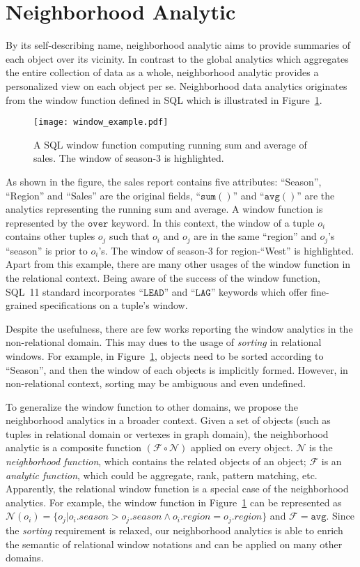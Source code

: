 \section{Neighborhood Analytic}
By its self-describing name, neighborhood analytic aims to provide
summaries of each object over its vicinity. In contrast to the global
analytics which aggregates the entire collection of data as a whole, neighborhood
analytic provides a personalized view on each object per se. Neighborhood
data analytics originates from the window function defined in  SQL which is
illustrated in Figure~\ref{fig:window}.

\begin{figure}[h]
\centering
\texttt{[image: window\_example.pdf]}
\caption{A SQL window function computing running sum and average of
sales. The window of season-3 is highlighted.} 
\label{fig:window}
\end{figure}

As shown in the figure, the sales report contains five attributes: 
``Season'', ``Region'' and ``Sales'' are the original fields, ``$\mathtt{sum()}$'' and ``$\mathtt{avg()}$''
are the analytics representing the running sum and average. A window function
is represented by the $\mathtt{over}$ keyword. In this context, the window of a tuple $o_i$
contains other tuples $o_j$ such that $o_i$ and $o_j$ are in the same ``region'' and $o_j$'s ``season'' is
prior to $o_i$'s. The window of season-$3$ for region-``West'' is highlighted.
Apart from this example, there are many other 
usages of the window function in the relational context. 
Being aware of the success of the window function, 
SQL~11 standard incorporates ``$\mathtt{LEAD}$'' and ``$\mathtt{LAG}$'' 
keywords which offer fine-grained specifications on a tuple's window.

Despite the usefulness, there are few works reporting the window
analytics in the non-relational domain. This may dues to the
usage of \emph{sorting} in relational windows. For example,
in Figure~\ref{fig:window},
objects need to be sorted according to ``Season'', and then the window of
each objects is implicitly formed. However, 
in non-relational context, sorting may be ambiguous and even undefined.

To generalize the window function to other domains, we propose the neighborhood
analytics in a broader context. Given a set of objects 
(such as tuples in relational domain or vertexes in graph domain),
the neighborhood analytic is a composite function
$(\mathcal{F} \circ \mathcal{N})$ applied on every object. $\mathcal{N}$
is the \emph{neighborhood function}, which contains the related objects of an object;
$\mathcal{F}$ is an \emph{analytic function}, which could be aggregate, rank,
pattern matching, etc.
Apparently, the relational window function is a special case of the
neighborhood analytics. For example, the window function in Figure~\ref{fig:window} 
can be represented as $\mathcal{N}(o_i)=\{o_j | o_i.season > o_j.season \wedge o_i.region = o_j.region\}$
and $\mathcal{F} = \mathtt{avg}$.
Since the \emph{sorting} requirement is relaxed, our neighborhood analytics is able to
enrich the semantic of relational window notations 
and can be applied on many other domains.